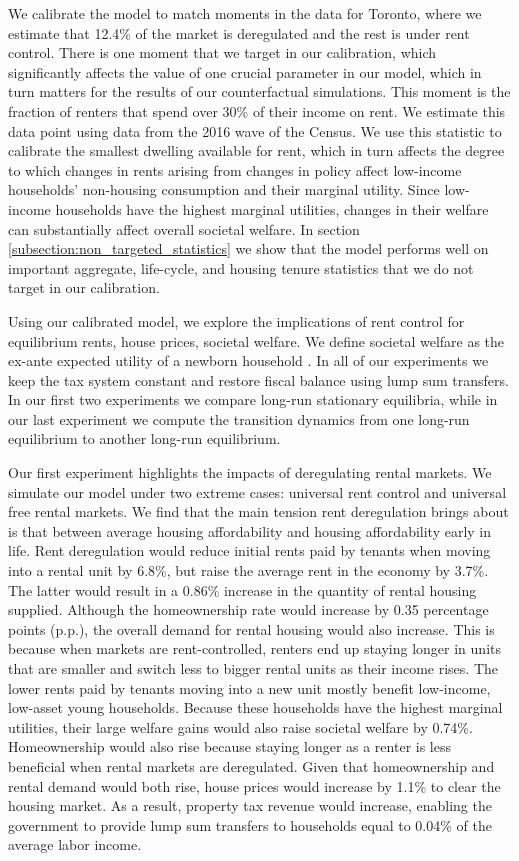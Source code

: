 \documentclass[parskip=full]{article}
\begin{document}
We calibrate the model to match moments in the data for Toronto, where we estimate that 12.4\% of the market is deregulated and the rest is under rent control. There is one moment that we target in our calibration, which significantly affects the value of one crucial parameter in our model, which in turn matters for the results of our counterfactual simulations. This moment is the fraction of renters that spend over 30\% of their income on rent. We estimate this data point using data from the 2016 wave of the Census. We use this statistic to calibrate the smallest dwelling available for rent, which in turn affects the degree to which changes in rents arising from changes in policy affect low-income households' non-housing consumption and their marginal utility. Since low-income households have the highest marginal utilities, changes in their welfare can substantially affect overall societal welfare. In section \ref{subsection:non_targeted_statistics} we show that the model performs well on important aggregate, life-cycle, and housing tenure statistics that we do not target in our calibration.

Using our calibrated model, we explore the implications of rent control for equilibrium rents, house prices, societal welfare. We define societal welfare as the ex-ante expected utility of a newborn household \citep{conesa-et-al,gkkoc}. In all of our experiments we keep the tax system constant and restore fiscal balance using lump sum transfers. In our first two experiments we compare long-run stationary equilibria, while in our last experiment we compute the transition dynamics from one long-run equilibrium to another long-run equilibrium. 

Our first experiment highlights the impacts of deregulating rental markets. We simulate our model under two extreme cases: universal rent control and universal free rental markets. We find that the main tension rent deregulation brings about is that between average housing affordability and housing affordability early in life. Rent deregulation would reduce initial rents paid by tenants when moving into a rental unit by 6.8\%, but raise the average rent in the economy by 3.7\%. The latter would result in a 0.86\% increase in the quantity of rental housing supplied. Although the homeownership rate would increase by 0.35 percentage points (p.p.), the overall demand for rental housing would also increase. This is because when markets are rent-controlled, renters end up staying longer in units that are smaller and switch less to bigger rental units as their income rises. The lower rents paid by tenants moving into a new unit mostly benefit low-income, low-asset young households. Because these households have the highest marginal utilities, their large welfare gains would also raise societal welfare by 0.74\%. Homeownership would also rise because staying longer as a renter is less beneficial when rental markets are deregulated. Given that homeownership and rental demand would both rise, house prices would increase by 1.1\% to clear the housing market. As a result, property tax revenue would increase, enabling the government to provide lump sum transfers to households equal to 0.04\% of the average labor income.
\end{document}
